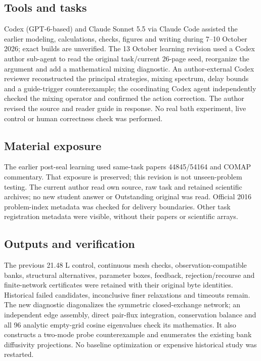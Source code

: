 \documentclass[12pt,a4paper]{article}
\begin{document}
\subsection*{Tools and tasks}
Codex (GPT-6-based) and Claude Sonnet 5.5 via Claude Code assisted the earlier modeling, calculations, checks, figures and writing during 7–10 October 2026; exact builds are unverified. The 13 October learning revision used a Codex author sub-agent to read the original task/current 26-page seed, reorganize the argument and add a mathematical mixing diagnostic. An author-external Codex reviewer reconstructed the principal strategies, mixing spectrum, delay bounds and a guide-trigger counterexample; the coordinating Codex agent independently checked the mixing operator and confirmed the action correction. The author revised the source and reader guide in response. No real bath experiment, live control or human correctness check was performed.

\subsection*{Material exposure}
The earlier post-seal learning used same-task papers 44845/54164 and COMAP commentary. That exposure is preserved; this revision is not unseen-problem testing. The current author read own source, raw task and retained scientific archives; no new student answer or Outstanding original was read. Official 2016 problem-index metadata was checked for delivery boundaries. Other task registration metadata were visible, without their papers or scientific arrays.

\subsection*{Outputs and verification}
The previous 21.48 L control, continuous mesh checks, observation-compatible banks, structural alternatives, parameter boxes, feedback, rejection/recourse and finite-network certificates were retained with their original byte identities. Historical failed candidates, inconclusive finer relaxations and timeouts remain. The new diagnostic diagonalizes the symmetric closed-exchange network; an independent edge assembly, direct pair-flux integration, conservation balance and all 96 analytic empty-grid cosine eigenvalues check its mathematics. It also constructs a two-mode probe counterexample and enumerates the existing bank diffusivity projections. No baseline optimization or expensive historical study was restarted.
\end{document}
